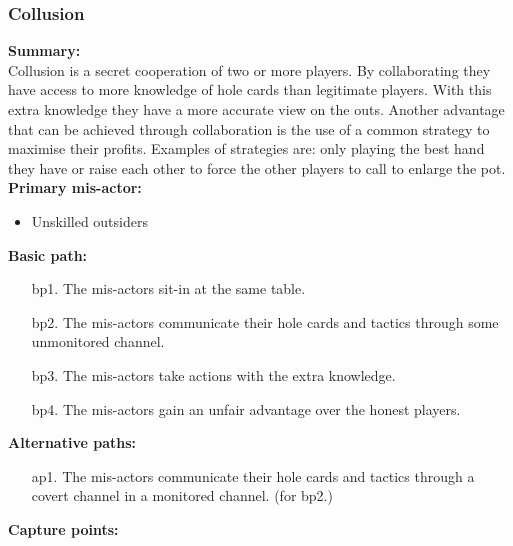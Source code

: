 \documentclass[a4paper,11pt]{report}
\begin{document}
\subsubsection{Collusion}
\textbf{Summary:} \\
Collusion is a secret cooperation of two or more players. By collaborating they have access to more knowledge of hole cards than legitimate players. With this extra knowledge they have a more accurate view on the outs. Another advantage that can be achieved through collaboration is the use of a common strategy to maximise their profits. Examples of strategies are: only playing the best hand they have or raise each other to force the other players to call to enlarge the pot. \\
\textbf{Primary mis-actor:}
\begin{itemize}
\item Unskilled outsiders
\end{itemize}
\textbf{Basic path:}
\begin{enumerate}
\item[bp1.] The mis-actors sit-in at the same table.
\item[bp2.] The mis-actors communicate their hole cards and tactics through some unmonitored channel.
\item[bp3.] The mis-actors take actions with the extra knowledge.
\item[bp4.] The mis-actors gain an unfair advantage over the honest players.
\end{enumerate}
\textbf{Alternative paths:}
\begin{itemize}
\item[ap1.] The mis-actors communicate their hole cards and tactics through a covert channel in a monitored channel. (for bp2.)
\end{itemize}
\textbf{Capture points:}
\end{document}
